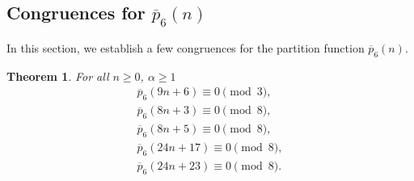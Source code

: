 \documentclass[11pt, reqno]{amsart}
\newtheorem{theorem}{Theorem}[section]
\numberwithin{equation}{section}
\begin{document}
	\subsection{Congruences for $\overline{p}_{6}(n)$}
	In this section, we establish a few congruences for the partition function  $\overline{p}_{6}(n)$.
	\begin{theorem}\label{th6}For all $n\geq0$, $\alpha\geq1$
		\begin{align}
			\overline{p}_{6}(9n+6)\equiv0\pmod{3},\label{res61}\\
			\overline{p}_{6}(8n+3)\equiv0\pmod{8},\label{res62}\\
			\overline{p}_{6}(8n+5)\equiv0\pmod{8},\label{res63}\\
			\overline{p}_{6}(24n+17)\equiv0\pmod{8},\label{res64}\\
			\overline{p}_{6}(24n+23)\equiv0\pmod{8}.\label{res65}
		\end{align}
	\end{theorem}
\end{document}
